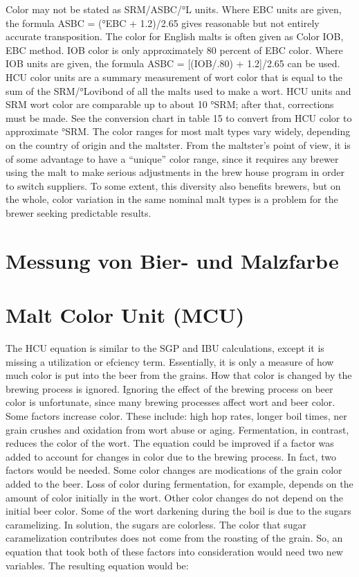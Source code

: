 \documentclass[a4paper,parskip=half]{scrartcl}
\begin{document}
\parencite[11]{Noonan1996}
Color may not be stated as SRM/ASBC/°L units.
Where EBC units are given, the formula ASBC = (°EBC
+ 1.2)/2.65 gives reasonable but not entirely accurate
transposition. The color for English malts is often given as
Color IOB, EBC method. IOB color is only approximately
80 percent of EBC color. Where IOB units are given, the
formula ASBC = [(IOB/.80) + 1.2]/2.65 can be used.
HCU color units are a summary measurement of
wort color that is equal to the sum of the SRM/°Lovibond
of all the malts used to make a wort. HCU units and SRM
wort color are comparable up to about 10 °SRM; after that,
corrections must be made. See the conversion chart in
table 15 to convert from HCU color to approximate °SRM.
The color ranges for most malt types vary widely,
depending on the country of origin and the maltster. From
the maltster’s point of view, it is of some advantage to
have a “unique” color range, since it requires any brewer
using the malt to make serious adjustments in the brew
house program in order to switch suppliers. To some
extent, this diversity also benefits brewers, but on the
whole, color variation in the same nominal malt types is a
problem for the brewer seeking predictable results.

\section*{Messung von Bier- und Malzfarbe}



\section*{Malt Color Unit (MCU)}

\parencite{Colby2000}
The HCU equation is similar to the SGP and IBU calculations, except it is missing a utilization or efciency term.
Essentially, it is only a measure of how much color is put into the beer from the grains. How that color is
changed by the brewing process is ignored.
Ignoring the effect of the brewing process on beer color is unfortunate, since many brewing processes affect
wort and beer color. Some factors increase color. These include: high hop rates, longer boil times, ner grain
crushes and oxidation from wort abuse or aging. Fermentation, in contrast, reduces the color of the wort.
The equation could be improved if a factor was added to account for changes in color due to the brewing
process. In fact, two factors would be needed. Some color changes are modications of the grain color added to
the beer. Loss of color during fermentation, for example, depends on the amount of color initially in the wort.
Other color changes do not depend on the initial beer color. Some of the wort darkening during the boil is due
to the sugars caramelizing. In solution, the sugars are colorless. The color that sugar caramelization contributes
does not come from the roasting of the grain.
So, an equation that took both of these factors into consideration would need two new variables. The resulting
equation would be:
\end{document}
